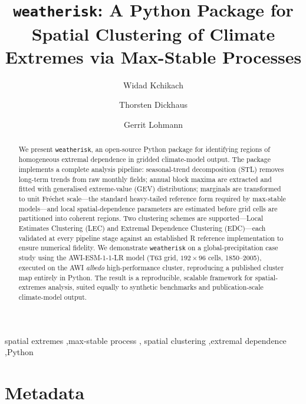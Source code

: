 \documentclass[preprint,12pt,a4paper]{elsarticle}
\begin{document}
\begin{frontmatter}

\title{\texttt{weatherisk}: A Python Package for Spatial Clustering
  of Climate Extremes via Max-Stable Processes}

\author[awi,uni]{Widad Kchikach}

\author[uni]{Thorsten Dickhaus}
\author[awi,uni]{Gerrit Lohmann}

\address[awi]{Alfred Wegener Institute Helmholtz Centre for Polar
  and Marine Research, Bremerhaven, Germany}
\address[uni]{University of Bremen, Bremen, Germany}

\begin{abstract}
We present \texttt{weatherisk}, an open-source Python package for
identifying regions of homogeneous extremal dependence in gridded
climate-model output. The package implements a
complete analysis pipeline: seasonal-trend decomposition (STL) removes
long-term trends from raw monthly fields; annual block maxima are
extracted and fitted with generalised extreme-value (GEV)
distributions; marginals are transformed to unit Fr\'{e}chet
scale---the standard heavy-tailed reference form required by max-stable
models---and local spatial-dependence parameters are estimated before
grid cells are partitioned into coherent regions. Two clustering
schemes are supported---Local Estimates Clustering (LEC) and Extremal
Dependence Clustering (EDC)---each validated at every pipeline stage
against an established R reference implementation to ensure numerical
fidelity. We demonstrate \texttt{weatherisk} on a global-precipitation
case study using the AWI-ESM-1-1-LR model (T63 grid, $192\times96$
cells, 1850--2005), executed on the AWI \emph{albedo}
high-performance cluster, reproducing a published cluster map entirely
in Python. The result is a reproducible, scalable framework for
spatial-extremes analysis, suited equally to synthetic benchmarks and
publication-scale climate-model output.
\end{abstract}

\begin{keyword}
spatial extremes \sep max-stable process \sep
spatial clustering \sep extremal dependence \sep Python
\end{keyword}

\end{frontmatter}

\section*{Metadata}
\label{sec:metadata}
\end{document}
